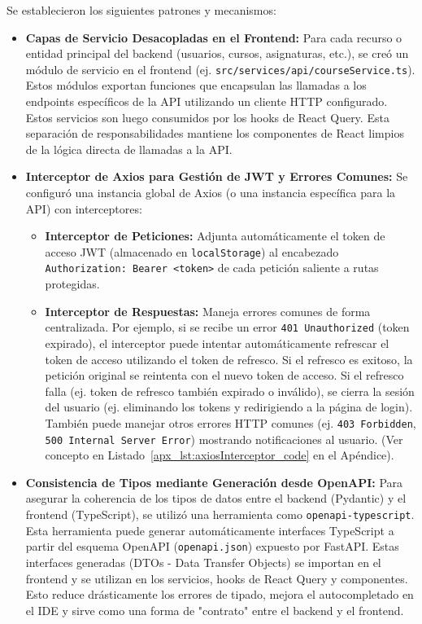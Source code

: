 Se establecieron los siguientes patrones y mecanismos:
\begin{itemize}[leftmargin=*]
  \item \textbf{Capas de Servicio Desacopladas en el Frontend:} Para cada recurso o entidad principal del backend (usuarios, cursos, asignaturas, etc.), se creó un módulo de servicio en el frontend (ej. \texttt{src/services/api/courseService.ts}). Estos módulos exportan funciones que encapsulan las llamadas a los endpoints específicos de la API utilizando un cliente HTTP configurado. Estos servicios son luego consumidos por los hooks de React Query. Esta separación de responsabilidades mantiene los componentes de React limpios de la lógica directa de llamadas a la API.

  \item \textbf{Interceptor de Axios para Gestión de JWT y Errores Comunes:} Se configuró una instancia global de Axios (o una instancia específica para la API) con interceptores:
        \begin{itemize}
            \item \textbf{Interceptor de Peticiones:} Adjunta automáticamente el token de acceso JWT (almacenado en \texttt{localStorage}) al encabezado \texttt{Authorization: Bearer <token>} de cada petición saliente a rutas protegidas.
            \item \textbf{Interceptor de Respuestas:} Maneja errores comunes de forma centralizada. Por ejemplo, si se recibe un error \texttt{401 Unauthorized} (token expirado), el interceptor puede intentar automáticamente refrescar el token de acceso utilizando el token de refresco. Si el refresco es exitoso, la petición original se reintenta con el nuevo token de acceso. Si el refresco falla (ej. token de refresco también expirado o inválido), se cierra la sesión del usuario (ej. eliminando los tokens y redirigiendo a la página de login). También puede manejar otros errores HTTP comunes (ej. \texttt{403 Forbidden}, \texttt{500 Internal Server Error}) mostrando notificaciones al usuario. (Ver concepto en Listado~\ref{apx_lst:axiosInterceptor_code} en el Apéndice).
        \end{itemize}

  \item \textbf{Consistencia de Tipos mediante Generación desde OpenAPI:} Para asegurar la coherencia de los tipos de datos entre el backend (Pydantic) y el frontend (TypeScript), se utilizó una herramienta como \texttt{openapi-typescript}. Esta herramienta puede generar automáticamente interfaces TypeScript a partir del esquema OpenAPI (\texttt{openapi.json}) expuesto por FastAPI. Estas interfaces generadas (DTOs - Data Transfer Objects) se importan en el frontend y se utilizan en los servicios, hooks de React Query y componentes. Esto reduce drásticamente los errores de tipado, mejora el autocompletado en el IDE y sirve como una forma de "contrato" entre el backend y el frontend.


\end{itemize}

